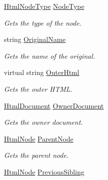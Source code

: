 \begin{DoxyCompactItemize}
\hyperlink{namespace_html_agility_pack_a0f81457339b5330e8cf9abe5a6123171}{Html\+Node\+Type} \hyperlink{class_html_agility_pack_1_1_html_node_a5057a2127d29a5018e8043025bc18a32}{Node\+Type}
\begin{DoxyCompactList}\small\item\em Gets the type of the node. \end{DoxyCompactList}\item 
string \hyperlink{class_html_agility_pack_1_1_html_node_ae1b9a68b86d7ac1272506778316b8d49}{Original\+Name}
\begin{DoxyCompactList}\small\item\em Gets the name of the original. \end{DoxyCompactList}\item 
virtual string \hyperlink{class_html_agility_pack_1_1_html_node_a4675ff356a9ccd38c609d8fcfb234c62}{Outer\+Html}
\begin{DoxyCompactList}\small\item\em Gets the outer H\+T\+ML. \end{DoxyCompactList}\item 
\hyperlink{class_html_agility_pack_1_1_html_document}{Html\+Document} \hyperlink{class_html_agility_pack_1_1_html_node_a593b9d1d1bd3cf82f8d62c1b4937563f}{Owner\+Document}
\begin{DoxyCompactList}\small\item\em Gets the owner document. \end{DoxyCompactList}\item 
\hyperlink{class_html_agility_pack_1_1_html_node}{Html\+Node} \hyperlink{class_html_agility_pack_1_1_html_node_ac50158da9dcbc8b0ce7fa61f1faf1703}{Parent\+Node}
\begin{DoxyCompactList}\small\item\em Gets the parent node. \end{DoxyCompactList}\item 
\hyperlink{class_html_agility_pack_1_1_html_node}{Html\+Node} \hyperlink{class_html_agility_pack_1_1_html_node_a8841f064bc5b00751c48a04aa761678d}{Previous\+Sibling}

\end{DoxyCompactItemize}
